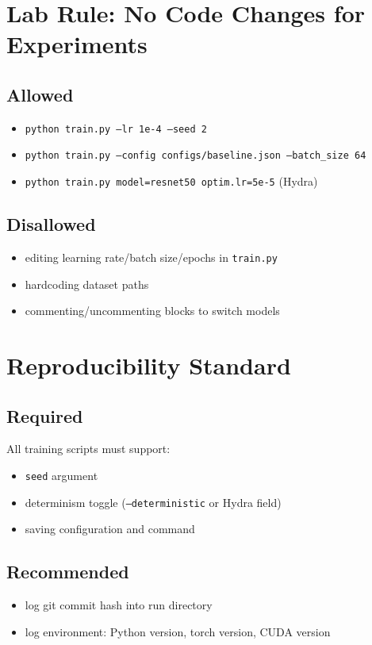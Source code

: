 \documentclass[11pt]{article}
\begin{document}
\section{Lab Rule: No Code Changes for Experiments}
\subsection{Allowed}
\begin{itemize}[nosep]
    \item \texttt{python train.py --lr 1e-4 --seed 2}
    \item \texttt{python train.py --config configs/baseline.json --batch\_size 64}
    \item \texttt{python train.py model=resnet50 optim.lr=5e-5} (Hydra)
\end{itemize}

\subsection{Disallowed}
\begin{itemize}[nosep]
    \item editing learning rate/batch size/epochs in \texttt{train.py}
    \item hardcoding dataset paths
    \item commenting/uncommenting blocks to switch models
\end{itemize}

\section{Reproducibility Standard}
\subsection{Required}
All training scripts must support:
\begin{itemize}[nosep]
    \item \texttt{seed} argument
    \item determinism toggle (\texttt{--deterministic} or Hydra field)
    \item saving configuration and command
\end{itemize}

\subsection{Recommended}
\begin{itemize}[nosep]
    \item log git commit hash into run directory
    \item log environment: Python version, torch version, CUDA version
\end{itemize}
\end{document}
